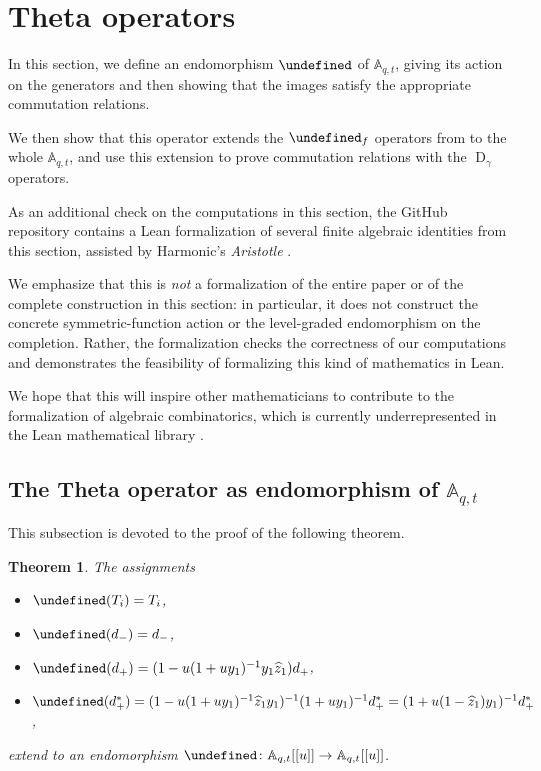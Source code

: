 \documentclass[reqno]{amsart}
\theoremstyle{plain}
\newtheorem{theorem}{Theorem}[section]
\theoremstyle{definition}
\theoremstyle{remark}
\DeclareMathOperator{\D}{D}
\newcommand{\A}{\mathbb{A}}%
\newcommand{\z}{\widehat{z}}
\let\oldTheta\Theta
\let\Theta\undefined
\DeclareMathOperator{\Theta}{\oldTheta}
\newcommand{\<}{\langle}
\renewcommand{\>}{\rangle}
\begin{document}
\section{Theta operators}
\label{sec:Theta}

In this section, we define an endomorphism $\Theta$ of $\A_{q,t}$, giving its action on the generators and then showing that the images satisfy the appropriate commutation relations.

We then show that this operator extends the $\Theta_f$ operators from \cite{DAdderioIraciVandenWyngaerd2021ThetaOperators} to the whole $\A_{q,t}$, and use this extension to prove commutation relations with the $\D_\gamma$ operators.

As an additional check on the computations in this section, the GitHub repository \cite{Iraci2026Code} contains a Lean formalization of several finite algebraic identities from this section, assisted by Harmonic's \emph{Aristotle} \cite{Achim2025Aristotle}.

We emphasize that this is \emph{not} a formalization of the entire paper or of the complete construction in this section: in particular, it does not construct the concrete symmetric-function action or the level-graded endomorphism on the completion.
Rather, the formalization checks the correctness of our computations and demonstrates the feasibility of formalizing this kind of mathematics in Lean.

We hope that this will inspire other mathematicians to contribute to the formalization of algebraic combinatorics, which is currently underrepresented in the Lean mathematical library \cite{Mathlib2020}.


\subsection{The Theta operator as endomorphism of \texorpdfstring{$\A_{q,t}$}{Aqt}}

This subsection is devoted to the proof of the following theorem.

\begin{theorem}
    \label{thm:Theta_def}
    The assignments
    \begin{itemize}
        \item $\Theta(T_i) = T_i$,
        \item $\Theta(d_-) = d_-$,
        \item $\Theta(d_+) = (1 - u (1 + u y_1)^{-1} y_1 \z_1) d_+$,
        \item $\Theta(d_+^*) = (1 - u (1 + u y_1)^{-1} \z_1 y_1)^{-1} (1 + uy_1)^{-1} d_+^*= (1 + u (1 - \z_1) y_1)^{-1} d_+^*$,
    \end{itemize}
    extend to an endomorphism $\Theta \colon \A_{q,t}[[u]] \rightarrow \A_{q,t}[[u]]$.
\end{theorem}
\end{document}
